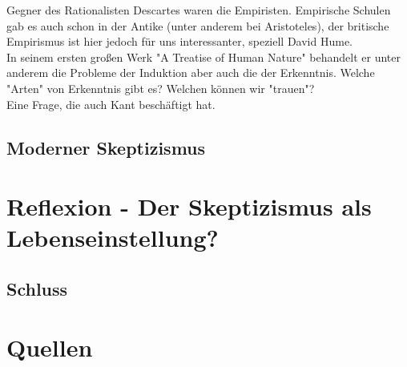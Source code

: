 \documentclass[12pt,a4paper]{article}
\begin{document}
Gegner des Rationalisten Descartes waren die Empiristen. Empirische Schulen gab es auch schon in der Antike (unter anderem bei Aristoteles), der britische Empirismus ist hier jedoch für uns interessanter, speziell David Hume.\\
 In seinem ersten großen Werk "A Treatise of Human Nature" behandelt er unter anderem die Probleme der Induktion aber auch die der Erkenntnis. Welche "Arten" von Erkenntnis gibt es? Welchen können wir "trauen"?\\

Eine Frage, die auch Kant beschäftigt hat.
	\subsection{Moderner Skeptizismus}
\section{Reflexion - Der Skeptizismus als Lebenseinstellung?}
	\subsection{Schluss}


\section*{Quellen}
\end{document}
